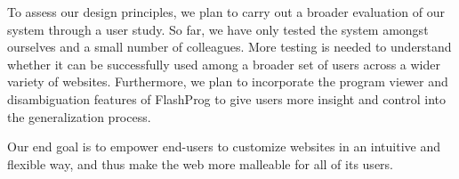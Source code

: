 \documentclass[sigconf,10pt]{acmart}
\begin{document}
To assess our design principles, we plan to carry out a broader
evaluation of our system through a user study. So far, we have only
tested the system amongst ourselves and a small number of colleagues.
More testing is needed to understand whether it can be successfully used
among a broader set of users across a wider variety of websites.
Furthermore, we plan to incorporate the program viewer and
disambiguation features of FlashProg \citep{mayer2015} to give users
more insight and control into the generalization process.

Our end goal is to empower end-users to customize websites in an
intuitive and flexible way, and thus make the web more malleable for all
of its users.




\end{document}
